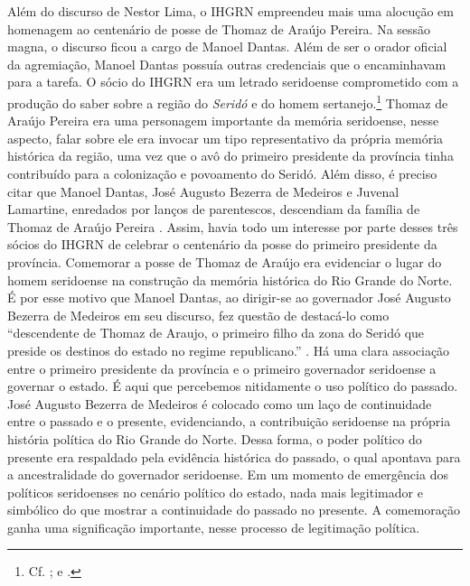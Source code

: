 \begin{refsection}
    Além do discurso de Nestor Lima, o IHGRN empreendeu mais uma alocução em homenagem ao centenário de posse de Thomaz de Araújo Pereira. Na sessão magna, o discurso ficou a cargo de Manoel Dantas. Além de ser o orador oficial da agremiação, Manoel Dantas possuía outras credenciais que o encaminhavam para a tarefa. O sócio do IHGRN era um letrado seridoense comprometido com a produção do saber sobre a região do \textit{Seridó} e do homem sertanejo.\footnote{Cf. ; e .} Thomaz de Araújo Pereira era uma personagem importante da memória seridoense, nesse aspecto, falar sobre ele era invocar um tipo representativo da própria memória histórica da região, uma vez que o avô do primeiro presidente da província tinha contribuído para a colonização e povoamento do Seridó. Além disso, é preciso citar que Manoel Dantas, José Augusto Bezerra de Medeiros e Juvenal Lamartine, enredados por lanços de parentescos, descendiam da família de Thomaz de Araújo Pereira \cite[p.~29]{MedeirosNeta2007Serido}. Assim, havia todo um interesse por parte desses três sócios do IHGRN de celebrar o centenário da posse do primeiro presidente da província. Comemorar a posse de Thomaz de Araújo era evidenciar o lugar do homem seridoense na construção da memória histórica do Rio Grande do Norte. É por esse motivo que Manoel Dantas, ao dirigir-se ao governador José Augusto Bezerra de Medeiros em seu discurso, fez questão de destacá-lo como ``descendente de Thomaz de Araujo, o primeiro filho da zona do Seridó que preside os destinos do estado no regime republicano.'' \cite[p.~177]{DiscursoManoealDantas}. Há uma clara associação entre o primeiro presidente da província e o primeiro governador seridoense a governar o estado. É aqui que percebemos nitidamente o uso político do passado. José Augusto Bezerra de Medeiros é colocado como um laço de continuidade entre o passado e o presente, evidenciando, a contribuição seridoense na própria história política do Rio Grande do Norte. Dessa forma, o poder político do presente era respaldado pela evidência histórica do passado, o qual apontava para a ancestralidade do governador seridoense. Em um momento de emergência dos políticos seridoenses no cenário político do estado, nada mais legitimador e simbólico do que mostrar a continuidade do passado no presente. A comemoração ganha uma significação importante, nesse processo de legitimação política. 


\end{refsection}
